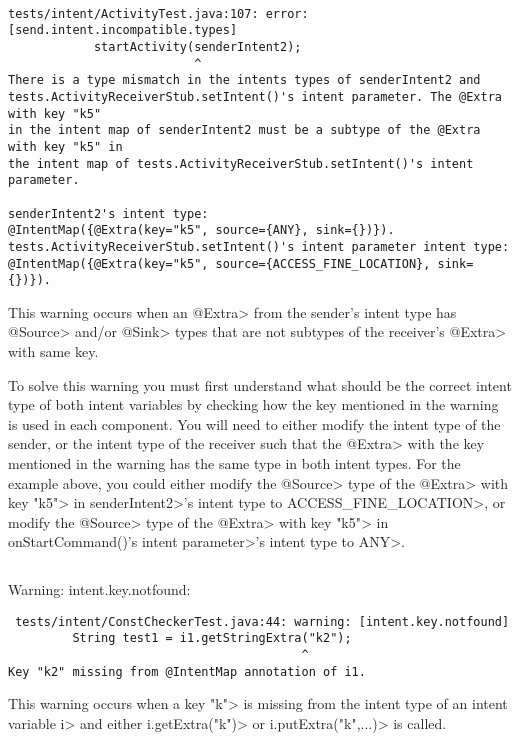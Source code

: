 \begin{Verbatim}

tests/intent/ActivityTest.java:107: error: [send.intent.incompatible.types] 
            startActivity(senderIntent2);
                          ^
There is a type mismatch in the intents types of senderIntent2 and
tests.ActivityReceiverStub.setIntent()'s intent parameter. The @Extra with key "k5"
in the intent map of senderIntent2 must be a subtype of the @Extra with key "k5" in
the intent map of tests.ActivityReceiverStub.setIntent()'s intent parameter.

senderIntent2's intent type:
@IntentMap({@Extra(key="k5", source={ANY}, sink={})}).
tests.ActivityReceiverStub.setIntent()'s intent parameter intent type:
@IntentMap({@Extra(key="k5", source={ACCESS_FINE_LOCATION}, sink={})}).

\end{Verbatim}

This warning occurs when an \<@Extra> from the sender's intent type has
\<@Source> and/or \<@Sink> types that are not subtypes of the receiver's
\<@Extra> with same key.

To solve this warning you must first understand what should be the correct
intent type of both intent variables by checking how the key mentioned in the
warning is used in each component. You will need to either modify the intent type of
the sender, or the intent type of the receiver such that the \<@Extra> with the
key mentioned in the warning has the same type in both intent types. For the
example above, you could either modify the \<@Source> type of the \<@Extra> with
key \<"k5"> in \<senderIntent2>'s intent type to \<ACCESS\_FINE\_LOCATION>, or
modify the \<@Source> type of the \<@Extra> with key \<"k5"> 
in \<onStartCommand()'s intent parameter>'s intent type to \<ANY>.

\begin{Verbatim}

\end{Verbatim}

\noindent
Warning: intent.key.notfound:

\begin{Verbatim}
 tests/intent/ConstCheckerTest.java:44: warning: [intent.key.notfound] 
         String test1 = i1.getStringExtra("k2");
                                         ^
Key "k2" missing from @IntentMap annotation of i1.
\end{Verbatim}

This warning occurs when a key \<"k"> is missing from the intent
type of an intent variable \<i> and either \<i.getExtra("k")> or 
\<i.putExtra("k",...)> is called.

